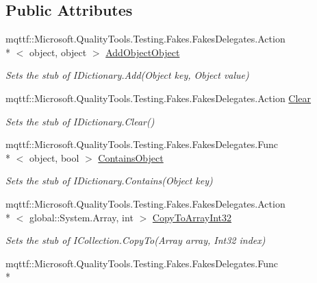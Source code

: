 \subsection*{Public Attributes}
\begin{DoxyCompactItemize}
\item 
mqttf\-::\-Microsoft.\-Quality\-Tools.\-Testing.\-Fakes.\-Fakes\-Delegates.\-Action\\*
$<$ object, object $>$ \hyperlink{class_system_1_1_collections_1_1_specialized_1_1_fakes_1_1_stub_i_ordered_dictionary_ae8bcfc316fcdfebdda94a065a29fb35e}{Add\-Object\-Object}
\begin{DoxyCompactList}\small\item\em Sets the stub of I\-Dictionary.\-Add(\-Object key, Object value)\end{DoxyCompactList}\item 
mqttf\-::\-Microsoft.\-Quality\-Tools.\-Testing.\-Fakes.\-Fakes\-Delegates.\-Action \hyperlink{class_system_1_1_collections_1_1_specialized_1_1_fakes_1_1_stub_i_ordered_dictionary_ad4d1d8d664213e4c0757563bb7bc88a7}{Clear}
\begin{DoxyCompactList}\small\item\em Sets the stub of I\-Dictionary.\-Clear()\end{DoxyCompactList}\item 
mqttf\-::\-Microsoft.\-Quality\-Tools.\-Testing.\-Fakes.\-Fakes\-Delegates.\-Func\\*
$<$ object, bool $>$ \hyperlink{class_system_1_1_collections_1_1_specialized_1_1_fakes_1_1_stub_i_ordered_dictionary_a7bceceef5b6ad0d5cad0b910822aa4d3}{Contains\-Object}
\begin{DoxyCompactList}\small\item\em Sets the stub of I\-Dictionary.\-Contains(\-Object key)\end{DoxyCompactList}\item 
mqttf\-::\-Microsoft.\-Quality\-Tools.\-Testing.\-Fakes.\-Fakes\-Delegates.\-Action\\*
$<$ global\-::\-System.\-Array, int $>$ \hyperlink{class_system_1_1_collections_1_1_specialized_1_1_fakes_1_1_stub_i_ordered_dictionary_a4ef647906b21858cf1432af71c0135a1}{Copy\-To\-Array\-Int32}
\begin{DoxyCompactList}\small\item\em Sets the stub of I\-Collection.\-Copy\-To(\-Array array, Int32 index)\end{DoxyCompactList}\item 
mqttf\-::\-Microsoft.\-Quality\-Tools.\-Testing.\-Fakes.\-Fakes\-Delegates.\-Func\\*

\end{DoxyCompactItemize}
